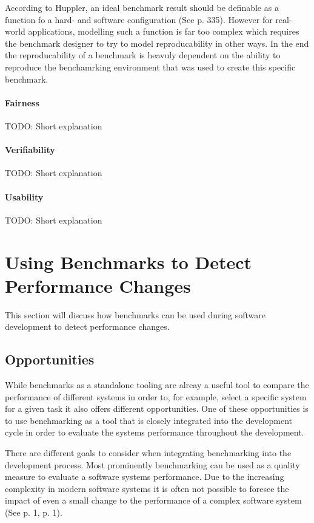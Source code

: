 \documentclass[	runningheads,
				a4paper]{llncs}
\begin{document}
According to Huppler, an ideal benchmark result should be definable as a function fo a hard- and software configuration (See \cite{huppler2009} p. 335). However for real-world applications, modelling such a function is far too complex which requires the benchmark designer to try to model reproducability in other ways. In the end the reproducability of a benchmark is heavuly dependent on the ability to reproduce the benchamrking environment that was used to create this specific benchmark. 

\paragraph{Fairness} TODO: Short explanation
\paragraph{Verifiability} TODO: Short explanation
\paragraph{Usability} TODO: Short explanation

\section{Using Benchmarks to Detect Performance Changes}
\label{sec:bench_perf_changes}
	This section will discuss how benchmarks can be used during software development to detect performance changes.
	
	\subsection{Opportunities}
	\label{ssec:bench_perf_oppo}
	While benchmarks as a standalone tooling are alreay a useful tool to compare the performance of different systems in order to, for example, select a specific system for a given task it also offers different opportunities. One of these opportunities is to use benchmarking as a tool that is closely integrated into the development cycle in order to evaluate the systems performance throughout the development.

	There are different goals to consider when integrating benchmarking into the development process. Most prominently benchmarking can be used as a quality measure to evaluate a software systems performance. Due to the increasing complexity in modern software systems it is often not possible to foresee the impact of even a small change to the performance of a complex software system (See \cite{grambow2019} p. 1, \cite{daly2021} p. 1). 
	
\end{document}

